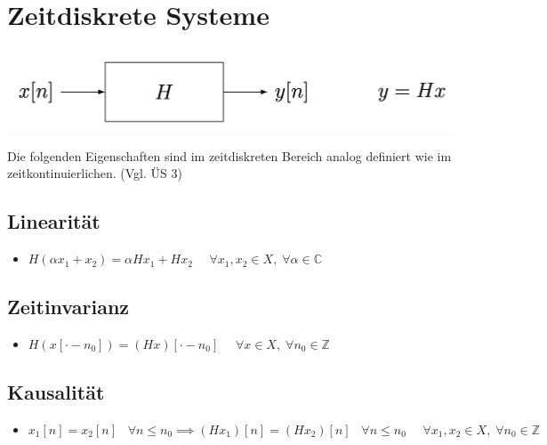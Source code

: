 \documentclass[11pt]{article}
\begin{document}
\pagebreak

\section*{Zeitdiskrete Systeme}
\vspace*{-0.5cm}
\begin{center}
    \includegraphics[width=0.55\linewidth]{docimgs/System_zeitdiskret.png}
\end{center}
\vspace*{-0.5cm}
Die folgenden Eigenschaften sind im zeitdiskreten Bereich analog definiert wie im zeitkontinuierlichen. (Vgl. ÜS 3)
\vspace*{-0.75cm}
\subsection*{Linearität}
\vspace*{-0.5cm}
\begin{itemize}
    \item $H(\alpha x_1 + x_2) = \alpha H x_1 + H x_2 \hspace{16pt} \forall x_1, x_2 \in X, \; \forall \alpha \in \mathbb{C}$
\end{itemize}
\vspace*{-0.75cm}
\subsection*{Zeitinvarianz}
\vspace*{-0.5cm}
\begin{itemize}
    \item $H(x[\cdot -n_0]) = (Hx)[\cdot -n_0] \hspace{16pt} \forall x\in X, \; \forall n_0 \in \mathbb{Z}$
\end{itemize}
\vspace*{-0.75cm}
\subsection*{Kausalität}
\vspace*{-0.5cm}
\begin{itemize}
    \item $x_1[n] = x_2[n] \hspace{10pt} \forall n \leq n_0 \implies (Hx_1)[n] = (Hx_2)[n] \hspace{10pt} \forall n \leq n_0 \hspace{16pt} \forall x_1, x_2 \in X, \; \forall n_0 \in \mathbb{Z}$
\end{itemize}
\vspace*{-0.75cm}
\end{document}

